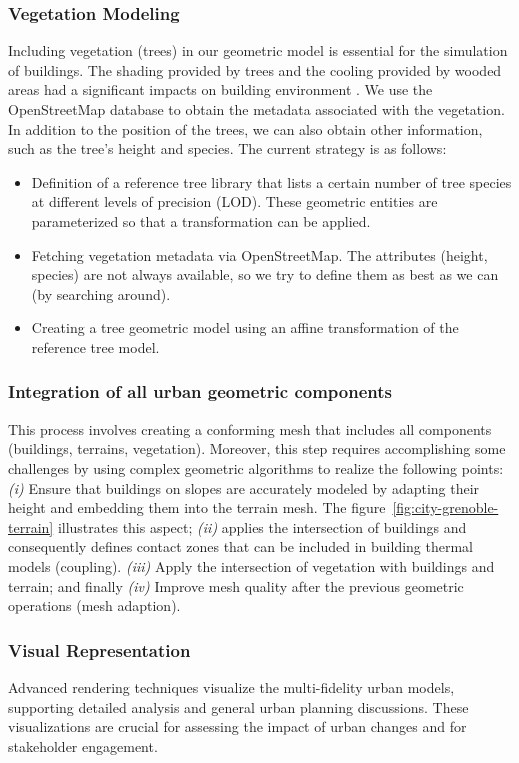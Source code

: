\documentclass[runningheads]{llncs}
\begin{document}
\subsubsection{Vegetation Modeling}
Including vegetation (trees) in our geometric model is essential for the simulation of buildings. The shading provided by trees and the cooling provided by wooded areas had a significant impacts on building environment  . We use the OpenStreetMap database to obtain the metadata associated with the vegetation. In addition to the position of the trees, we can also obtain other information, such as the tree's height and species. The current strategy is as follows:
\begin{itemize}
\item Definition of a reference tree library that lists a certain number of tree species at different levels of precision (LOD). These geometric entities are parameterized so that a transformation can be applied.
\item Fetching vegetation metadata via OpenStreetMap. The attributes (height, species) are not always available, so we try to define them as best as we can (by searching around).
\item Creating a tree geometric model using an affine transformation of the reference tree model.
\end{itemize}

\subsubsection{Integration of all urban geometric components}
This process involves creating a conforming mesh that includes all components (buildings, terrains, vegetation). Moreover, this step requires accomplishing some challenges by using complex geometric algorithms to realize the following points: \textit{(i)} Ensure that buildings on slopes are accurately modeled by adapting their height and embedding them into the terrain mesh. The figure~\ref{fig:city-grenoble-terrain} illustrates this aspect; \textit{(ii)} applies the intersection of buildings and consequently defines contact zones that can be included in building thermal models (coupling). \textit{(iii)} Apply the intersection of vegetation with buildings and terrain; and finally \textit{(iv)} Improve mesh quality after the previous geometric operations (mesh adaption).

\subsubsection{Visual Representation}
Advanced rendering techniques visualize the multi-fidelity urban models, supporting detailed analysis and general urban planning discussions. 
These visualizations are crucial for assessing the impact of urban changes and for stakeholder engagement.
\end{document}
